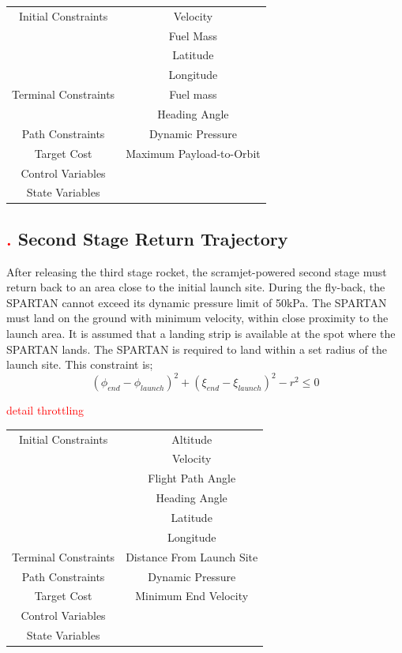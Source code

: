 \begin{table}[ht]
\begin{tabular}{|c|c|}
	\hline Initial Constraints  & Velocity \\ & Fuel Mass  \\ & Latitude \\ & Longitude \\ 
	\hline Terminal Constraints & Fuel mass \\ & Heading Angle \\ 
	\hline Path Constraints & Dynamic Pressure \\ 
	\hline Target Cost & Maximum Payload-to-Orbit \\ 
			\hline Control Variables &  \\ 
			\hline State Variables &  \\ 
	\hline 
\end{tabular} 

\end{table}

\subsection{\textcolor{red}{.} Second Stage Return Trajectory}
After releasing the third stage rocket, the scramjet-powered second stage must return back to an area close to the initial launch site.
During the fly-back, the SPARTAN cannot exceed its dynamic pressure limit of 50kPa. 
The SPARTAN must land on the ground with minimum velocity, within close proximity to the launch area. It is assumed that a landing strip is available at the spot where the SPARTAN lands. The SPARTAN is required to land within a set radius of the launch site. This constraint is;
\begin{equation}
(\phi_{end} - \phi_{launch})^2 + (\xi_{end} - \xi_{launch})^2 - r^2 \leq 0
\end{equation}

\textcolor{red}{detail throttling}


\begin{tabular}{|c|c|}
	\hline Initial Constraints  & Altitude \\ & Velocity\\ & Flight Path Angle\\ & Heading Angle\\ & Latitude\\ & Longitude\\ 
	\hline Terminal Constraints &  Distance From Launch Site \\ 
	\hline Path Constraints & Dynamic Pressure \\ 
	\hline Target Cost & Minimum End Velocity \\ 
				\hline Control Variables &  \\ 
				\hline State Variables &  \\ 
	\hline 
\end{tabular} 




